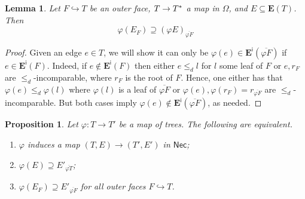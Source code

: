 \documentclass[a4paper,10pt
,draft
]{article}%
\numberwithin{equation}{section}
\numberwithin{figure}{section}
\newtheorem{lemma}[equation]{Lemma}%
\newtheorem{proposition}[equation]{Proposition}%
\theoremstyle{definition} %
\newcommand{\1}{\ensuremath{\mathbbm 1}}%
\begin{document}
\begin{lemma}\label{EFPHI LEM}
	Let $F \hookrightarrow T$
	be an outer face,
	$T \to T^{\**}$ a map in $\Omega$,
	and $E \subseteq \boldsymbol{E}(T)$.
	Then
	\[
	\varphi(E_F) 
	\supseteq 
	\left(\varphi E\right)_{\overline{\varphi F}}
	\]
\end{lemma}


\begin{proof}
Given an edge $e \in T$, 
we will show it can only be 
$\varphi(e) \in \boldsymbol{E}^{\mathsf{i}}
(\overline{\varphi F})$ if
$e \in \boldsymbol{E}^{\mathsf{i}}
(F)$.
Indeed, if $e \nin \boldsymbol{E}^{\mathsf{i}}
(F)$
then either $e \leq_d l$ for $l$ some leaf of $F$
or $e,r_F$ are $\leq_d$-incomparable, where $r_F$ is the root of $F$.
Hence, one either has that
$\varphi(e) \leq_d \varphi(l)$ where $\varphi(l)$ is a leaf of 
$\overline{\varphi F}$
or
$\varphi(e),\varphi(r_F) = r_{\overline{\varphi F}}$
are $\leq_d$-incomparable. But both cases imply 
$\varphi(e) \nin \boldsymbol{E}^{\mathsf{i}}
(\overline{\varphi F})$, as needed.
\end{proof}



\begin{proposition}\label{NECKMAPCHAR PROP}
	Let $\varphi \colon T \to T'$ be a map of trees. 
	The following are equivalent.
\begin{enumerate}[label=(\roman*)]
\item $\varphi$ induces a map 
	$(T,E) \to (T',E')$ in $\mathsf{Nec}$;
\item $\varphi (E) \supseteq E'_{\overline{\varphi T}}$;
\item $\varphi (E_F) \supseteq E'_{\overline{\varphi F}}$
	for all outer faces $F \hookrightarrow T$.
\end{enumerate}
\end{proposition}
\end{document}
